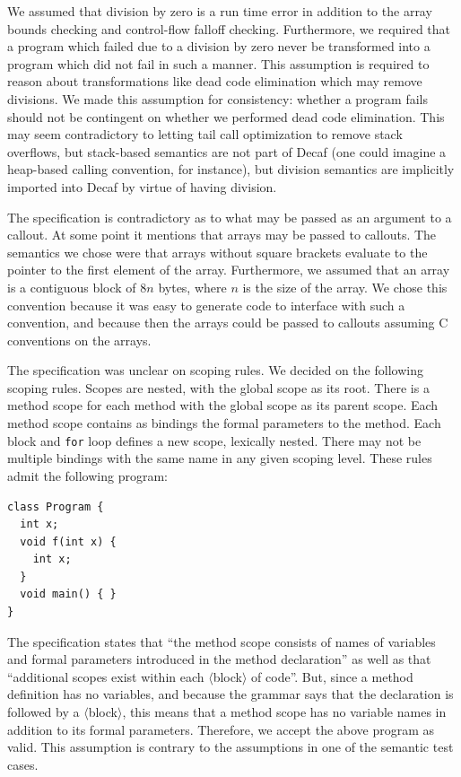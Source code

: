 \documentclass[11pt]{article}
\begin{document}
We assumed that division by zero is a run time error in addition to
the array bounds checking and control-flow falloff checking.
Furthermore, we required that a program which failed due to a division
by zero never be transformed into a program which did not fail in such
a manner.  This assumption is required to reason about transformations
like dead code elimination which may remove divisions.  We made this
assumption for consistency: whether a program fails should not be
contingent on whether we performed dead code elimination.  This may
seem contradictory to letting tail call optimization to remove stack
overflows, but stack-based semantics are not part of Decaf (one could
imagine a heap-based calling convention, for instance), but division
semantics are implicitly imported into Decaf by virtue of having
division.

The specification is contradictory as to what may be passed as an
argument to a callout.  At some point it mentions that arrays may be
passed to callouts.  The semantics we chose were that arrays without
square brackets evaluate to the pointer to the first element of the
array.  Furthermore, we assumed that an array is a contiguous block of
$8n$ bytes, where $n$ is the size of the array.  We chose this
convention because it was easy to generate code to interface with such
a convention, and because then the arrays could be passed to callouts
assuming C conventions on the arrays.

The specification was unclear on scoping rules.  We decided on the
following scoping rules.  Scopes are nested, with the global scope as
its root.  There is a method scope for each method with the global
scope as its parent scope.  Each method scope contains as bindings the
formal parameters to the method.  Each block and \texttt{for} loop
defines a new scope, lexically nested.  There may not be multiple
bindings with the same name in any given scoping level.  These rules
admit the following program:
\begin{verbatim}
class Program {
  int x;
  void f(int x) {
    int x;
  }
  void main() { }
}
\end{verbatim}
The specification states that ``the method scope consists of names of
variables and formal parameters introduced in the method declaration''
as well as that ``additional scopes exist within each
$\langle$block$\rangle$ of code''.  But, since a method definition has
no variables, and because the grammar says that the declaration is
followed by a $\langle$block$\rangle$, this means that a method scope
has no variable names in addition to its formal parameters.
Therefore, we accept the above program as valid.  This assumption is
contrary to the assumptions in one of the semantic test cases.
\end{document}
